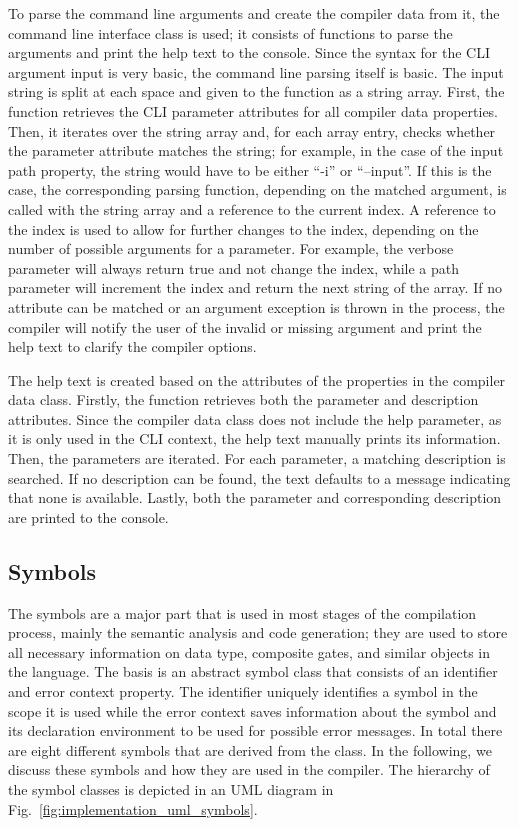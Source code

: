 To parse the command line arguments and create the compiler data from it, the command line interface class is used; it consists of functions to parse the arguments and print the help text to the console. Since the syntax for the CLI argument input is very basic, the command line parsing itself is basic. The input string is split at each space and given to the function as a string array. First, the function retrieves the CLI parameter attributes for all compiler data properties. Then, it iterates over the string array and, for each array entry, checks whether the parameter attribute matches the string; for example, in the case of the input path property, the string would have to be either ``-i'' or ``--input''. If this is the case, the corresponding parsing function, depending on the matched argument, is called with the string array and a reference to the current index. A reference to the index is used to allow for further changes to the index, depending on the number of possible arguments for a parameter. For example, the verbose parameter will always return true and not change the index, while a path parameter will increment the index and return the next string of the array. If no attribute can be matched or an argument exception is thrown in the process, the compiler will notify the user of the invalid or missing argument and print the help text to clarify the compiler options.

The help text is created based on the attributes of the properties in the compiler data class. Firstly, the function retrieves both the parameter and description attributes. Since the compiler data class does not include the help parameter, as it is only used in the CLI context, the help text manually prints its information. Then, the parameters are iterated. For each parameter, a matching description is searched. If no description can be found, the text defaults to a message indicating that none is available. Lastly, both the parameter and corresponding description are printed to the console.

\subsection{Symbols}
\label{sec:implementation_symbols}
The symbols are a major part that is used in most stages of the compilation process, mainly the semantic analysis and code generation; they are used to store all necessary information on data type, composite gates, and similar objects in the language. The basis is an abstract symbol class that consists of an identifier and error context property. The identifier uniquely identifies a symbol in the scope it is used while the error context saves information about the symbol and its declaration environment to be used for possible error messages. In total there are eight different symbols that are derived from the class. In the following, we discuss these symbols and how they are used in the compiler. The hierarchy of the symbol classes is depicted in an UML diagram in Fig.~\ref{fig:implementation_uml_symbols}.

